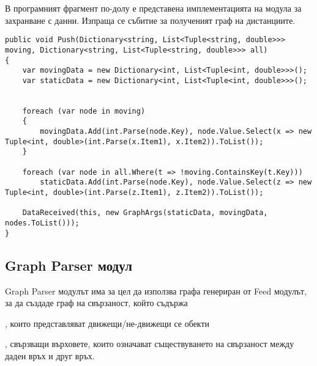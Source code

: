 В програмният фрагмент по-долу е представена имплементацията на модула за захранване с данни. Изпраща се събитие за полученият граф на дистанциите.
\begin{lstlisting}
public void Push(Dictionary<string, List<Tuple<string, double>>> moving, Dictionary<string, List<Tuple<string, double>>> all)
{
    var movingData = new Dictionary<int, List<Tuple<int, double>>>();
    var staticData = new Dictionary<int, List<Tuple<int, double>>>();


    foreach (var node in moving)
    {
        movingData.Add(int.Parse(node.Key), node.Value.Select(x => new Tuple<int, double>(int.Parse(x.Item1), x.Item2)).ToList());
    }

    foreach (var node in all.Where(t => !moving.ContainsKey(t.Key)))
        staticData.Add(int.Parse(node.Key), node.Value.Select(z => new Tuple<int, double>(int.Parse(z.Item1), z.Item2)).ToList());

    DataReceived(this, new GraphArgs(staticData, movingData, nodes.ToList()));
}
\end{lstlisting}

\pagebreak

\subsection{Graph Parser модул}
Graph Parser модулът има за цел да използва графа генериран от Feed модулът, за да създаде граф на свързаност, който съдържа
\begin{enumerate}

, които представляват движещи/не-движещи се обекти 

, свързващи върховете, които означават съществуването на свързаност между
даден връх и друг връх.\\

\end{enumerate}

